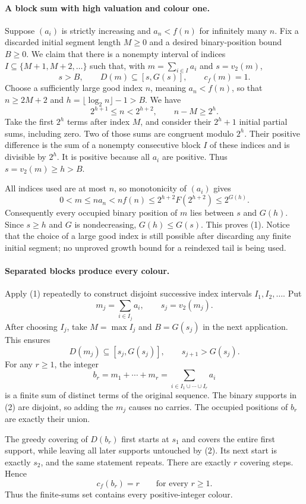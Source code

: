 \paragraph{A block sum with high valuation and colour one.}
Suppose \((a_i)\) is strictly increasing and \(a_n<f(n)\) for infinitely many \(n\). Fix a discarded initial segment length \(M\geq0\) and a desired binary-position bound \(B\geq0\). We claim that there is a nonempty interval of indices \(I\subseteq\{M+1,M+2,\ldots\}\) such that, with \(m=\sum_{i\in I}a_i\) and \(s=v_2(m)\),
\[
 s>B,\qquad D(m)\subseteq[s,G(s)],\qquad c_f(m)=1. \tag{1}
\]
Choose a sufficiently large good index \(n\), meaning \(a_n<f(n)\), so that \(n\geq2M+2\) and
\(h=\lfloor\log_2 n\rfloor-1>B\). We have
\[
 2^{h+1}\leq n<2^{h+2},\qquad n-M\geq2^h.
\]
Take the first \(2^h\) terms after index \(M\), and consider their \(2^h+1\) initial partial sums, including zero. Two of those sums are congruent modulo \(2^h\). Their positive difference is the sum of a nonempty consecutive block \(I\) of these indices and is divisible by \(2^h\). It is positive because all \(a_i\) are positive. Thus \(s=v_2(m)\geq h>B\).

All indices used are at most \(n\), so monotonicity of \((a_i)\) gives
\[
 0<m\leq n a_n<n f(n)
 \leq 2^{h+2}F(2^{h+2})\leq2^{G(h)}.
\]
Consequently every occupied binary position of \(m\) lies between \(s\) and \(G(h)\). Since \(s\geq h\) and \(G\) is nondecreasing, \(G(h)\leq G(s)\). This proves (1). Notice that the choice of a large good index is still possible after discarding any finite initial segment; no unproved growth bound for a reindexed tail is being used.

\paragraph{Separated blocks produce every colour.}
Apply (1) repeatedly to construct disjoint successive index intervals \(I_1,I_2,\ldots\). Put
\[
 m_j=\sum_{i\in I_j}a_i,\qquad s_j=v_2(m_j).
\]
After choosing \(I_j\), take \(M=\max I_j\) and \(B=G(s_j)\) in the next application. This ensures
\[
 D(m_j)\subseteq[s_j,G(s_j)],\qquad s_{j+1}>G(s_j). \tag{2}
\]
For any \(r\geq1\), the integer
\[
 b_r=m_1+\cdots+m_r
 =\sum_{i\in I_1\cup\cdots\cup I_r}a_i
\]
is a finite sum of distinct terms of the original sequence. The binary supports in (2) are disjoint, so adding the \(m_j\) causes no carries. The occupied positions of \(b_r\) are exactly their union.

The greedy covering of \(D(b_r)\) first starts at \(s_1\) and covers the entire first support, while leaving all later supports untouched by (2). Its next start is exactly \(s_2\), and the same statement repeats. There are exactly \(r\) covering steps. Hence
\[
 c_f(b_r)=r\qquad\text{for every }r\geq1.
\]
Thus the finite-sums set contains every positive-integer colour.

